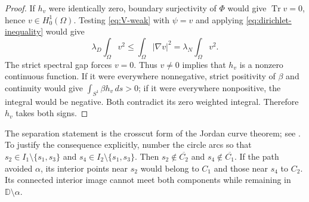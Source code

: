 \begin{proof}
If $h_v$ were identically zero, boundary surjectivity of $\Phi$ would
give $\operatorname{Tr}v=0$, hence $v\in H_0^1(\Omega)$.
Testing \cref{eq:V-weak} with $\psi=v$ and applying
\cref{eq:dirichlet-inequality} would give
\[
 \lambda_D\int_\Omega v^2
 \le\int_\Omega|\nabla v|^2
 =\lambda_N\int_\Omega v^2.
\]
The strict spectral gap forces $v=0$. Thus $v\ne0$ implies that $h_v$
is a nonzero continuous function. If it were everywhere nonnegative,
strict positivity of $\beta$ and continuity would give
$\int_{S^1}\beta h_v\,ds>0$; if it were everywhere nonpositive, the
integral would be negative. Both contradict its zero weighted integral.
Therefore $h_v$ takes both signs.
\end{proof}

The separation statement is the crosscut form of the Jordan curve
theorem; see \cite[Section 14.2, ``Crosscuts'']{Conway}.
To justify the consequence explicitly, number the circle arcs so that
$s_2\in I_1\setminus\{s_1,s_3\}$ and
$s_4\in I_2\setminus\{s_1,s_3\}$. Then $s_2\notin\overline{C_2}$
and $s_4\notin\overline{C_1}$. If the path avoided $\alpha$, its
interior points near $s_2$ would belong to $C_1$ and those near $s_4$
to $C_2$. Its connected interior image cannot meet both components
while remaining in $\mathbb D\setminus\alpha$.

